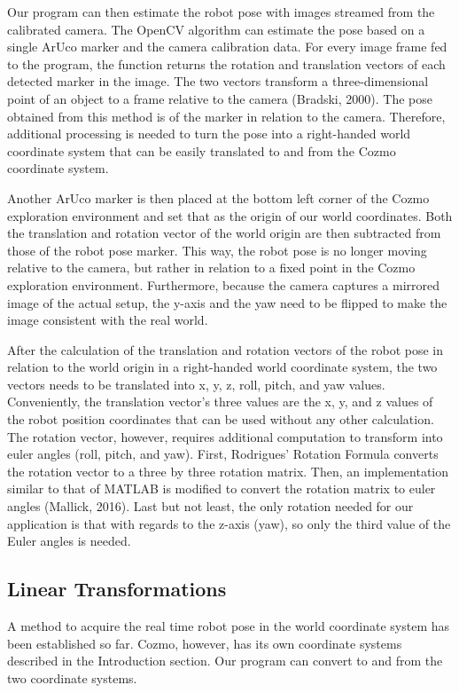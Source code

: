 \documentclass[man]{apa6}
\begin{document}
Our program can then estimate the robot pose with images streamed from the calibrated camera. The OpenCV algorithm can estimate the pose based on a single ArUco marker and the camera calibration data. For every image frame fed to the program, the function returns the rotation and translation vectors of each detected marker in the image. The two vectors transform a three-dimensional point of an object to a frame relative to the camera (Bradski, 2000). The pose obtained from this method is of the marker in relation to the camera. Therefore, additional processing is needed to turn the pose into a right-handed world coordinate system that can be easily translated to and from the Cozmo coordinate system.

Another ArUco marker is then placed at the bottom left corner of the Cozmo exploration environment and set that as the origin of our world coordinates. Both the translation and rotation vector of the world origin are then subtracted from those of the robot pose marker. This way, the robot pose is no longer moving relative to the camera, but rather in relation to a fixed point in the Cozmo exploration environment. Furthermore, because the camera captures a mirrored image of the actual setup, the y-axis and the yaw need to be flipped to make the image consistent with the real world.

After the calculation of the translation and rotation vectors of the robot pose in relation to the world origin in a right-handed world coordinate system, the two vectors needs to be translated into x, y, z, roll, pitch, and yaw values. Conveniently, the translation vector’s three values are the x, y, and z values of the robot position coordinates that can be used without any other calculation. The rotation vector, however, requires additional computation to transform into euler angles (roll, pitch, and yaw). First, Rodrigues' Rotation Formula converts the rotation vector to a three by three rotation matrix. Then, an implementation similar to that of MATLAB is modified to convert the rotation matrix to euler angles (Mallick, 2016). Last but not least, the only rotation needed for our application is that with regards to the z-axis (yaw), so only the third value of the Euler angles is needed.


\subsection{Linear Transformations}
A method to acquire the real time robot pose in the world coordinate system has been established so far. Cozmo, however, has its own coordinate systems described in the Introduction section. Our program can convert to and from the two coordinate systems.
\end{document}
